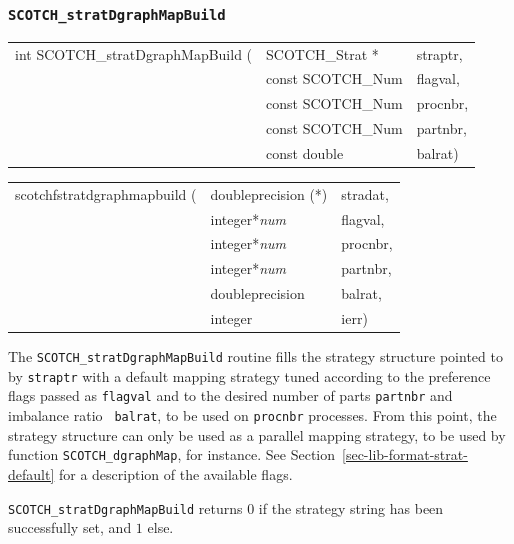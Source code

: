 \subsubsection{{\tt SCOTCH\_stratDgraphMapBuild}}

\begin{itemize}
\progsyn

{\tt\begin{tabular}{l@{}ll}
int SCOTCH\_stratDgraphMapBuild ( & SCOTCH\_Strat *   & straptr, \\
                                  & const SCOTCH\_Num & flagval, \\
                                  & const SCOTCH\_Num & procnbr, \\
                                  & const SCOTCH\_Num & partnbr, \\
                                  & const double      & balrat)
\end{tabular}}

{\tt\begin{tabular}{l@{}ll}
scotchfstratdgraphmapbuild ( & doubleprecision (*) & stradat, \\
                             & integer*{\it num}   & flagval, \\
                             & integer*{\it num}   & procnbr, \\
                             & integer*{\it num}   & partnbr, \\
                             & doubleprecision     & balrat,  \\
                             & integer             & ierr)
\end{tabular}}

\progdes

The {\tt SCOTCH\_stratDgraphMapBuild} routine fills the strategy
structure pointed to by {\tt straptr} with a default mapping strategy
tuned according to the preference flags passed as {\tt flagval} and to
the desired number of parts {\tt partnbr} and imbalance ratio {\tt
balrat}, to be used on {\tt procnbr} processes. From this point, the
strategy structure can only be used as a parallel mapping strategy, to
be used by function {\tt SCOTCH\_\lbt dgraph\lbt Map}, for
instance. See Section~\ref{sec-lib-format-strat-default} for a
description of the available flags.

\progret

{\tt SCOTCH\_stratDgraphMapBuild} returns $0$ if the strategy string
has been successfully set, and $1$ else.
\end{itemize}

